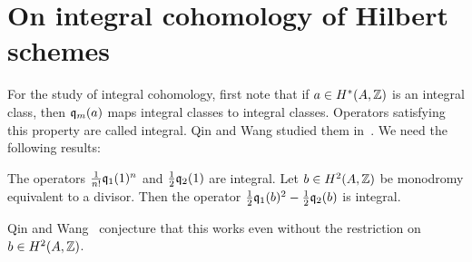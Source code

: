 

\section{On integral cohomology of Hilbert schemes}\label{basisHilb2}

For the study of integral cohomology, first note that if $a \in H^*(A,\mathbb{Z})$ is an integral class, then $\mathfrak{q}_{m}(a) $ maps integral classes to integral classes. Operators satisfying this property are called integral. Qin and Wang studied them in~\cite{QinWang}. We need the following results:

\begin{lemma} \cite[Lem.~3.3, 3.6 and Thm.~4.5]{QinWang}\label{IntegralOperators}
The operators $\frac{1}{n!}\mathfrak{q}_1(1)^n$ and $\frac{1}{2}\mathfrak{q}_2(1) $ are integral.
Let $b\in H^2(A,\mathbb{Z})$ be monodromy equivalent to a divisor. Then the operator $\frac{1}{2}\mathfrak{q}_1(b)^2 - \frac{1}{2}\mathfrak{q}_2(b)$ is integral. 
\end{lemma}
\begin{remark}
Qin and Wang~\cite[Thm. 1.1 et seq.]{QinWang} conjecture that this works even without the restriction on $b\in H^2(A,\mathbb{Z})$. 
\end{remark}

